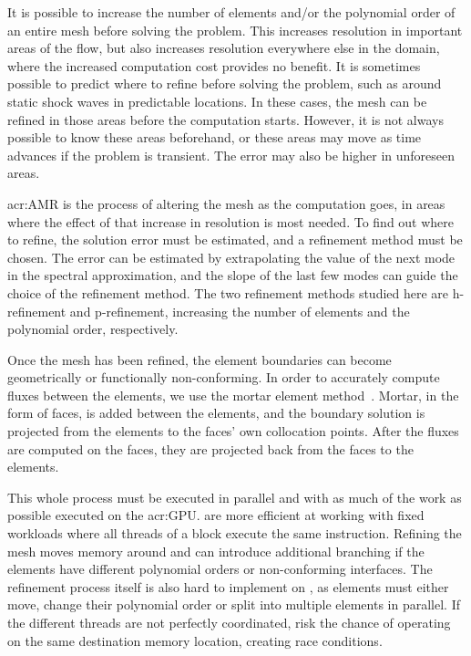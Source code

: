 It is possible to increase the number of elements and/or the polynomial order of an entire mesh
before solving the problem. This increases resolution in important areas of the flow, but also
increases resolution everywhere else in the domain, where the increased computation cost provides no
benefit. It is sometimes possible to predict where to refine before solving the problem, such as
around static shock waves in predictable locations. In these cases, the mesh can be refined in those
areas before the computation starts. However, it is not always possible to know these areas
beforehand, or these areas may move as time advances if the problem is transient. The error may also
be higher in unforeseen areas.

\Acrlong{acr:AMR} is the process of altering the mesh as the computation goes, in areas where the
effect of that increase in resolution is most needed. To find out where to refine, the solution
error must be estimated, and a refinement method must be chosen. The error can be estimated by
extrapolating the value of the next mode in the spectral approximation, and the slope of the last
few modes can guide the choice of the refinement method. The two refinement methods studied here are
h-refinement and p-refinement, increasing the number of elements and the polynomial order,
respectively.

Once the mesh has been refined, the element boundaries can become geometrically or functionally
non-conforming. In order to accurately compute fluxes between the elements, we use the mortar element
method~\cite{Maday1989}. Mortar, in the form of faces, is added between the elements, and the
boundary solution is projected from the elements to the faces' own collocation points. After the
fluxes are computed on the faces, they are projected back from the faces to the elements. 

This whole process must be executed in parallel and with as much of the work as possible executed on
the \acrshort{acr:GPU}.  are more efficient at working with fixed workloads
where all threads of a block execute the same instruction. Refining the mesh moves memory around and
can introduce additional branching if the elements have different polynomial orders or
non-conforming interfaces. The refinement process itself is also hard to implement on
, as elements must either move, change their polynomial order or split into
multiple elements in parallel. If the different threads are not perfectly coordinated, risk the
chance of operating on the same destination memory location, creating race conditions.

